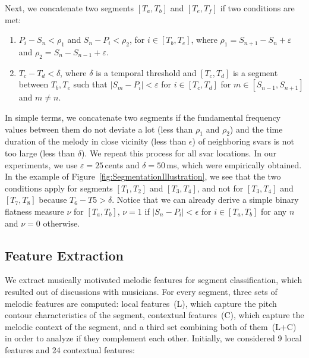Next, we concatenate two segments $[T_a,T_b]$ and $[T_e,T_f]$ if two conditions are met:
\begin{enumerate}
	\item $P_i-S_n < \rho_1$ and $S_n-P_i < \rho_2$, for $i\in[T_b,T_e]$, where $\rho_1 = S_{n+1}-S_n + \varepsilon$ and $\rho_2 = S_n-S_{n-1} + \varepsilon$. 
	\item $T_c-T_d < \delta$, where $\delta$ is a temporal threshold and $[T_c,T_d]$ is a segment between $T_b, T_e$ such that $\vert S_m-P_i\vert <\varepsilon$ for $i\in[T_c,T_d]$ for $m\in [S_{n-1}, S_{n+1}]$ and $m \neq n$.
\end{enumerate}
In simple terms, we concatenate two segments if the fundamental frequency values between them do not deviate a lot (less than $\rho_1$ and $\rho_2$) and the time duration of the melody in close vicinity (less than $\epsilon$) of neighboring svars is not too large (less than $\delta$). We repeat this process for all svar locations. In our experiments, we use $\varepsilon = 25$\,cents and $\delta=50$\,ms, which were empirically obtained. In the example of Figure~\ref{fig:SegmentationIllustration}, we see that the two conditions apply for segments $[T_1,T_2]$ and $[T_3,T_4]$, and not for $[T_3,T_4]$ and $[T_7,T_8]$ because $T_6-T5>\delta$. Notice that we can already derive a simple binary flatness measure $\nu$ for $[T_a, T_b]$, $\nu=1$ if $\vert S_n-P_i \vert< \epsilon$ for $i \in [T_a, T_b]$ for any $n$ and $\nu=0$ otherwise. 

\subsection{Feature Extraction}
\label{sec:features}

We extract musically motivated melodic features for segment classification, which resulted out of discussions with musicians. For every segment, three sets of melodic features are computed: local features~(L), which capture the pitch contour characteristics of the segment, contextual features~(C), which capture the melodic context of the segment, and a third set combining both of them~(L+C) in order to analyze if they complement each other. Initially, we considered 9 local features and 24 contextual features:

